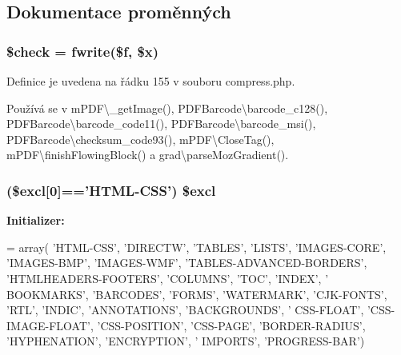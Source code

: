 \subsection{Dokumentace proměnných}
\hypertarget{compress_8php_a830cf70d25fefacddcf4c6bc3fd7a0e0}{
\subsubsection[{\$check}]{\setlength{\rightskip}{0pt plus 5cm}\$check = fwrite(\$f, \$x)}}\label{compress_8php_a830cf70d25fefacddcf4c6bc3fd7a0e0}


Definice je uvedena na řádku 155 v souboru compress.\-php.



Používá se v m\-P\-D\-F\textbackslash{}\-\_\-get\-Image(), P\-D\-F\-Barcode\textbackslash{}barcode\-\_\-c128(), P\-D\-F\-Barcode\textbackslash{}barcode\-\_\-code11(), P\-D\-F\-Barcode\textbackslash{}barcode\-\_\-msi(), P\-D\-F\-Barcode\textbackslash{}checksum\-\_\-code93(), m\-P\-D\-F\textbackslash{}\-Close\-Tag(), m\-P\-D\-F\textbackslash{}finish\-Flowing\-Block() a grad\textbackslash{}parse\-Moz\-Gradient().

\hypertarget{compress_8php_a06e94f7ec9d696fff3dcad27ba6b6d61}{
\subsubsection[{\$excl}]{ (\$excl\mbox{[}0\mbox{]}=='H\-T\-M\-L-\/C\-S\-S') \$excl}}\label{compress_8php_a06e94f7ec9d696fff3dcad27ba6b6d61}
{\bfseries Initializer\-:}
\begin{DoxyCode}
= array( \textcolor{stringliteral}{'HTML-CSS'}, \textcolor{stringliteral}{'DIRECTW'}, \textcolor{stringliteral}{'TABLES'}, \textcolor{stringliteral}{'LISTS'}, \textcolor{stringliteral}{'IMAGES-CORE'}, 
\textcolor{stringliteral}{'IMAGES-BMP'}, \textcolor{stringliteral}{'IMAGES-WMF'}, \textcolor{stringliteral}{'TABLES-ADVANCED-BORDERS'}, \textcolor{stringliteral}{'HTMLHEADERS-FOOTERS'}, \textcolor{stringliteral}{'COLUMNS'}, \textcolor{stringliteral}{'TOC'}, \textcolor{stringliteral}{'INDEX'}, \textcolor{stringliteral}{'
      BOOKMARKS'}, \textcolor{stringliteral}{'BARCODES'}, \textcolor{stringliteral}{'FORMS'}, \textcolor{stringliteral}{'WATERMARK'}, \textcolor{stringliteral}{'CJK-FONTS'}, \textcolor{stringliteral}{'RTL'}, \textcolor{stringliteral}{'INDIC'}, \textcolor{stringliteral}{'ANNOTATIONS'}, \textcolor{stringliteral}{'BACKGROUNDS'}, \textcolor{stringliteral}{'
      CSS-FLOAT'}, \textcolor{stringliteral}{'CSS-IMAGE-FLOAT'}, \textcolor{stringliteral}{'CSS-POSITION'}, \textcolor{stringliteral}{'CSS-PAGE'}, \textcolor{stringliteral}{'BORDER-RADIUS'}, \textcolor{stringliteral}{'HYPHENATION'}, \textcolor{stringliteral}{'ENCRYPTION'}, \textcolor{stringliteral}{'
      IMPORTS'}, \textcolor{stringliteral}{'PROGRESS-BAR'})
\end{DoxyCode}


